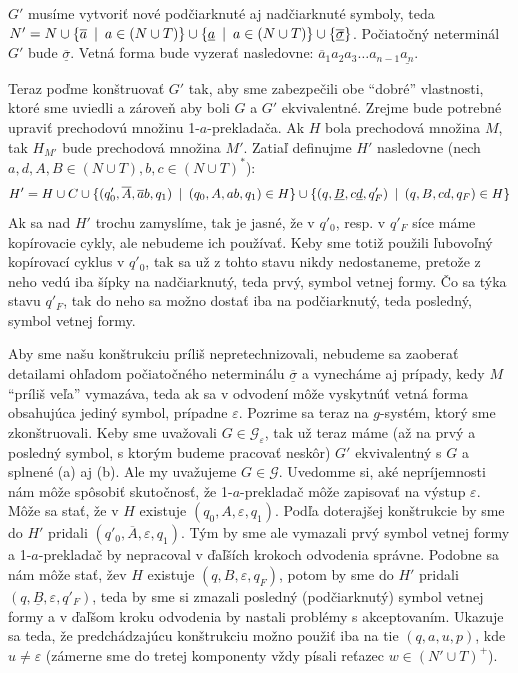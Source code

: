 \begin{dokaz}
\begin{enumerate}
\begin{enumerate}
    $G'$ musíme vytvoriť nové podčiarknuté aj nadčiarknuté symboly,
    teda $N'=N\cup\{\overline{a}\enspace |\enspace a\in(N\cup T
    )\}\cup\{\underline{a}\enspace |\enspace a\in(N\cup
    T)\}\cup\{\underline{\overline{\sigma}}\}$. Počiatočný neterminál
    $G'$ bude $\underline{\overline{\sigma}}$. Vetná forma bude
    vyzerať nasledovne: $\overline{a}_1 a_2 a_3\dots
    a_{n-1}\underline{a_n}$.
  \end{enumerate}
  Teraz poďme konštruovať $G'$ tak, aby sme zabezpečili obe
  ``dobré'' vlastnosti, ktoré sme uviedli a zároveň aby boli $G$ a
  $G'$ ekvivalentné. Zrejme bude potrebné upraviť prechodovú množinu
  1-$a$-prekladača. Ak $H$ bola prechodová množina $M$, tak $H_{M'}$
  bude prechodová množina $M'$. Zatiaľ definujme $H'$ nasledovne
  (nech $a,d,A,B\in(N\cup T),b,c\in(N\cup T)^*$):
  \[
  H'=H\cup C\cup\{(q'_0,\overline{A},\overline{a}b,q_1)\enspace |\enspace
  (q_0,A,ab,q_1)\in H\}\cup \{(q,\underline{B},c
  \underline{d},q'_F)\enspace |\enspace(q,B,cd,q_F)\in H\}
  \]
  Ak sa nad $H'$ trochu zamyslíme, tak je jasné, že v $q'_0$, resp.
  v $q'_F$ síce máme kopírovacie cykly, ale nebudeme ich používať.
  Keby sme totiž použili ľubovoľný kopírovací cyklus v $q'_0$, tak
  sa už z tohto stavu nikdy nedostaneme, pretože z neho vedú iba
  šípky na nadčiarknutý, teda prvý, symbol vetnej formy. Čo sa týka
  stavu $q'_F$, tak do neho sa možno dostať iba na podčiarknutý,
  teda posledný, symbol vetnej formy.

  Aby sme našu konštrukciu príliš nepretechnizovali, nebudeme sa
  zaoberať detailami oh\-ľa\-dom počiatočného neterminálu
  $\underline{\overline{\sigma}}$ a vynecháme aj prípady, kedy $M$
  ``príliš veľa'' vymazáva, teda ak sa v odvodení môže vyskytnúť
  vetná forma obsahujúca jediný symbol, prípadne $\varepsilon$.
  Pozrime sa teraz na $g$-systém, ktorý sme zkonštruovali. Keby sme
  uvažovali $G\in\mathcal{G_{\varepsilon}}$, tak už teraz máme (až
  na prvý a posledný symbol, s ktorým budeme pracovať neskôr) $G'$
  ekvivalentný s $G$ a splnené (a) aj (b). Ale my uvažujeme
  $G\in\mathcal{G}$. Uvedomme si, aké nepríjemnosti nám môže
  spôsobiť skutočnosť, že 1-$a$-prekladač môže zapisovať na výstup
  $\varepsilon$. Môže sa stať, že v $H$ existuje
  $(q_0,A,\varepsilon,q_1)$. Podľa doterajšej konštrukcie by sme do
  $H'$ pridali $(q'_0,\overline{A},\varepsilon,q_1)$. Tým by sme ale
  vymazali prvý symbol vetnej formy a 1-$a$-prekladač by nepracoval
  v ďaľších krokoch odvodenia správne. Podobne sa nám môže stať,
  že\linebreak v $H$ existuje $(q,B,\varepsilon,q_F)$, potom by sme
  do $H'$ pridali $(q,\underline{B},\varepsilon,q'_F)$, teda by sme
  si zmazali posledný (podčiarknutý) symbol vetnej formy a v ďaľšom
  kroku odvodenia by nastali problémy s akceptovaním. Ukazuje sa
  teda, že predchádzajúcu konštrukciu možno použiť iba na tie
  $(q,a,u,p)$, kde $u\neq\varepsilon$ (zámerne sme do tretej
  komponenty vždy písali reťazec $w\in(N'\cup T)^+$).


\end{enumerate}
\end{dokaz}
